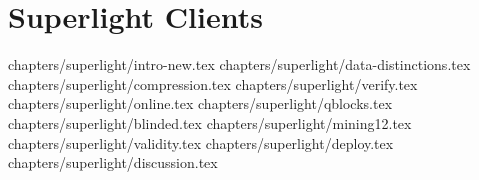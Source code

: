 \chapter{Superlight Clients}\label{chapter:superlight}

{chapters/superlight/intro-new.tex}
{chapters/superlight/data-distinctions.tex}
{chapters/superlight/compression.tex}
{chapters/superlight/verify.tex}
{chapters/superlight/online.tex}
{chapters/superlight/qblocks.tex}
{chapters/superlight/blinded.tex}
{chapters/superlight/mining12.tex}
{chapters/superlight/validity.tex}
{chapters/superlight/deploy.tex}
{chapters/superlight/discussion.tex}
